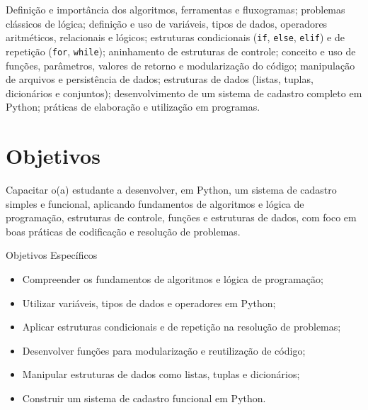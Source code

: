\documentclass[a4paper,12pt]{article}
\def\faIcon#1{}%
\def\hspace#1{ }%
\begin{document}
Definição e importância dos algoritmos, ferramentas e fluxogramas; problemas clássicos de lógica; definição e uso de variáveis, tipos de dados, operadores aritméticos, relacionais e lógicos; estruturas condicionais (\texttt{if}, \texttt{else}, \texttt{elif}) e de repetição (\texttt{for}, \texttt{while}); aninhamento de estruturas de controle; conceito e uso de funções, parâmetros, valores de retorno e modularização do código; manipulação de arquivos e persistência de dados; estruturas de dados (listas, tuplas, dicionários e conjuntos); desenvolvimento de um sistema de cadastro completo em Python; práticas de elaboração e utilização em programas.

\section{\faIcon{bullseye}\hspace{6pt}Objetivos}
Capacitar o(a) estudante a desenvolver, em Python, um sistema de cadastro simples e funcional, aplicando fundamentos de algoritmos e lógica de programação, estruturas de controle, funções e estruturas de dados, com foco em boas práticas de codificação e resolução de problemas.



\begin{bloco}[\faIcon{list-ul}]{Objetivos Específicos}
\begin{itemize}
  \item Compreender os fundamentos de algoritmos e lógica de programação;
  \item Utilizar variáveis, tipos de dados e operadores em Python;
  \item Aplicar estruturas condicionais e de repetição na resolução de problemas;
  \item Desenvolver funções para modularização e reutilização de código;
  \item Manipular estruturas de dados como listas, tuplas e dicionários;
  \item Construir um sistema de cadastro funcional em Python.
\end{itemize}
\end{bloco}
\end{document}
